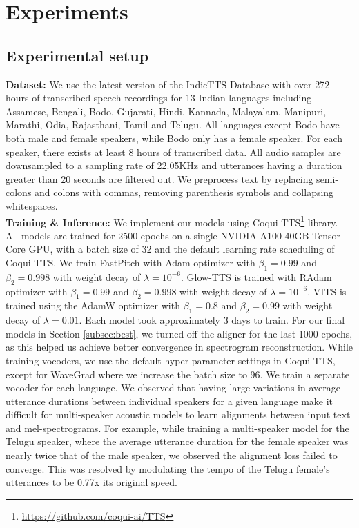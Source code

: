 \documentclass{article}
\begin{document}
\section{Experiments}

\subsection{Experimental setup}

\textbf{Dataset:} We use the latest version of the IndicTTS Database \cite{baby2016resources} with over 272 hours of transcribed speech recordings for 13 Indian languages including Assamese, Bengali, Bodo, Gujarati, Hindi, Kannada, Malayalam, Manipuri, Marathi, Odia, Rajasthani, Tamil and Telugu. All languages except Bodo have both male and female speakers, while Bodo only has a female speaker. For each speaker, there exists at least 8 hours of transcribed data. All audio samples are downsampled to a sampling rate of 22.05KHz and utterances having a duration greater than 20 seconds are filtered out. We preprocess text by replacing semi-colons and colons with commas, removing parenthesis symbols and collapsing whitespaces.
\\
\textbf{Training \& Inference:} We implement our models using Coqui-TTS\footnote{\scriptsize \url{https://github.com/coqui-ai/TTS}} library. All models are trained for 2500 epochs on a single NVIDIA A100 40GB Tensor Core GPU, with a batch size of 32 and the default learning rate scheduling of Coqui-TTS. We train FastPitch with Adam optimizer with $\beta_1=0.99$ and $\beta_2=0.998$ with weight decay of $\lambda=10^{-6}$. Glow-TTS is trained with RAdam optimizer with $\beta_1=0.99$ and $\beta_2=0.998$ with weight decay of $\lambda=10^{-6}$. VITS is trained using the AdamW optimizer with $\beta_1=0.8$ and $\beta_2=0.99$ with weight decay of $\lambda=0.01$. Each model took approximately 3 days to train. For our final models in Section \ref{subsec:best}, we turned off the aligner for the last 1000 epochs, as this helped us achieve better convergence in spectrogram reconstruction. While training vocoders, we use the default hyper-parameter settings in Coqui-TTS, except for WaveGrad where we increase the batch size to 96. We train a separate vocoder for each language. We observed that having large variations in average utterance durations between individual speakers for a given language make it difficult for multi-speaker acoustic models to learn alignments between input text and mel-spectrograms. 
For example, while training a multi-speaker model for the Telugu speaker, where the average utterance duration for the female speaker was nearly twice that of the male speaker, we observed the alignment loss failed to converge. This was resolved by modulating the tempo of the Telugu female's utterances to be 0.77x its original speed. 
\end{document}
